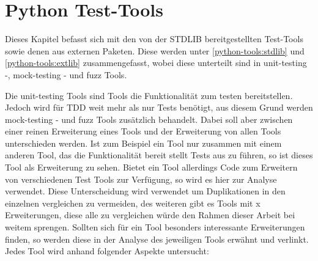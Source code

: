 \section{Python Test-Tools}\label{python-tools}

Dieses Kapitel befasst sich mit den von der STDLIB bereitgestellten Test-Tools
sowie denen aus externen Paketen.
Diese werden unter \ref{python-tools:stdlib} und \ref{python-tools:extlib}
zusammengefasst, wobei diese unterteilt sind in unit-testing -,
\gls{mock}-testing - und \gls{fuzz} Tools.

Die unit-testing Tools sind Tools die Funktionalität zum testen bereitstellen.
Jedoch wird für TDD weit mehr als nur Tests benötigt, aus diesem Grund werden
\gls{mock}-testing - und \gls{fuzz} Tools zusätzlich behandelt. Dabei soll aber
zwischen einer reinen Erweiterung eines Tools und der Erweiterung von allen Tools
unterschieden werden.
Ist zum Beispiel ein Tool nur zusammen mit einem anderen Tool, das die Funktionalität
bereit stellt Tests aus zu führen, so ist dieses Tool als Erweiterung zu sehen. Bietet
ein Tool allerdings Code zum Erweitern von verschiedenen Test Tools zur Verfügung, so
wird es hier zur Analyse verwendet.
Diese Unterscheidung wird verwendet um Duplikationen in den einzelnen vergleichen zu
vermeiden, des weiteren gibt es Tools mit x Erweiterungen, diese alle zu vergleichen würde
den Rahmen dieser Arbeit bei weitem sprengen.
Sollten sich für ein Tool besonders interessante Erweiterungen finden, so werden diese
in der Analyse des jeweiligen Tools erwähnt und verlinkt.
\newline
\\
Jedes Tool wird anhand folgender Aspekte untersucht:
